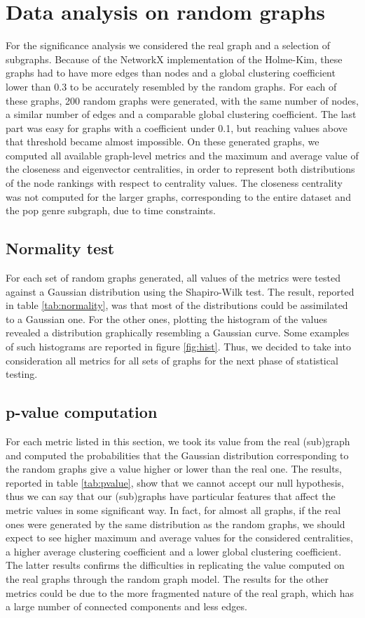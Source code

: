 \section{Data analysis on random graphs}

For the significance analysis we considered the real graph and a selection of subgraphs. Because of the NetworkX implementation of the Holme-Kim, these graphs had to have more edges than nodes and a global clustering coefficient lower than 0.3 to be accurately resembled by the random graphs. For each of these graphs, 200 random graphs were generated, with the same number of nodes, a similar number of edges and a comparable global clustering coefficient. The last part was easy for graphs with a coefficient under 0.1, but reaching values above that threshold became almost impossible. On these generated graphs, we computed all available graph-level metrics and the maximum and average value of the closeness and eigenvector centralities, in order to represent both distributions of the node rankings with respect to centrality values. The closeness centrality was not computed for the larger graphs, corresponding to the entire dataset and the pop genre subgraph, due to time constraints.

\subsection{Normality test}

For each set of random graphs generated, all values of the metrics were tested against a Gaussian distribution using the Shapiro-Wilk test. The result, reported in table \ref{tab:normality}, was that most of the distributions could be assimilated to a Gaussian one. For the other ones, plotting the histogram of the values revealed a distribution graphically resembling a Gaussian curve. Some examples of such histograms are reported in figure \ref{fig:hist}. Thus, we decided to take into consideration all metrics for all sets of graphs for the next phase of statistical testing.

\subsection{p-value computation}

For each metric listed in this section, we took its value from the real (sub)graph and computed the probabilities that the Gaussian distribution corresponding to the random graphs give a value higher or lower than the real one. The results, reported in table \ref{tab:pvalue}, show that we cannot accept our null hypothesis, thus we can say that our (sub)graphs have particular features that affect the metric values in some significant way. In fact, for almost all graphs, if the real ones were generated by the same distribution as the random graphs, we should expect to see higher maximum and average values for the considered centralities, a higher average clustering coefficient and a lower global clustering coefficient. The latter results confirms the difficulties in replicating the value computed on the real graphs through the random graph model. The results for the other metrics could be due to the more fragmented nature of the real graph, which has a large number of connected components and less edges.